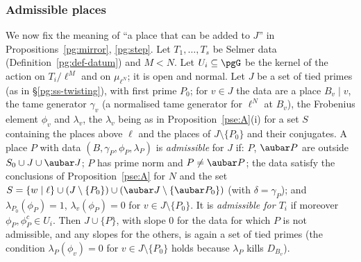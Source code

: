\documentclass[10pt]{amsart}
\theoremstyle{definition}
\theoremstyle{remark}
\begin{document}
\subsubsection*{Admissible places}
We now fix the meaning of ``a place that can be added to $J$'' in Propositions~\ref{pg:mirror},
\ref{pg:step}. Let $T_1,\dots,T_s$ be Selmer data (Definition~\ref{pg:def-datum}) and $M<N$. Let
$U_i\subseteq\pgG$ be the kernel of the action on $T_i/\ell^M$ and on $\mu_{\ell^N}$; it is open and
normal. Let $J$ be a set of tied primes (as in \S\ref{pg:ss-twisting}), with first prime $P_0$; for
$v\in J$ the data are a place $B_v\mid v$, the tame generator $\gamma_v$ (a normalised tame
generator for $\ell^N$ at $B_v$), the Frobenius element $\phi_v$ and $\lambda_v$, the $\lambda_v$
being as in Proposition~\ref{pse:A}(i) for a set $S$ containing the places above $\ell$ and the
places of $J\setminus\{P_0\}$ and their conjugates. A place $P$ with data $(B,\gamma_P,\phi_P,
\lambda_P)$ is \emph{admissible} for $J$ if: $P$, $\aubar P$ are outside $S_0\cup J\cup\aubar J$;
$P$ has prime norm and $P\ne\aubar P$; the data satisfy the conclusions of Proposition~\ref{pse:A}
for $N$ and the set $S=\{w\mid\ell\}\cup(J\setminus\{P_0\})\cup(\aubar J\setminus\{\aubar P_0\})$
(with $\delta=\gamma_P$); and $\lambda_{P_0}(\phi_P)=1$, $\lambda_v(\phi_P)=0$ for $v\in J\setminus
\{P_0\}$. It is \emph{admissible for $T_i$} if moreover $\phi_P,\phi_P^{c}\in U_i$. Then $J\cup
\{P\}$, with slope $0$ for the data for which $P$ is not admissible, and any slopes for the others,
is again a set of tied primes (the condition $\lambda_P(\phi_v)=0$ for $v\in J\setminus\{P_0\}$ holds
because $\lambda_P$ kills $D_{B_v}$).
\end{document}
